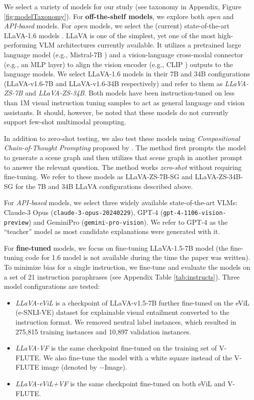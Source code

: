 We select a variety of models for our study (see taxonomy in Appendix, Figure \ref{fig:modelTaxonomy}). For \textbf{off-the-shelf models}, we explore both \textit{open} and \textit{API-based} models. For \textit{open} models, we select the (current) state-of-the-art LLaVA-1.6 models \cite{liu2024llavanext}. LLaVA is one of the simplest, yet one of the most high-performing VLM architectures currently available. It utilizes a pretrained large language model (e.g., Mistral-7B \cite{jiang2023mistral}) and a vision-language cross-modal connector (e.g., an MLP layer) to align the vision encoder (e.g., CLIP \cite{radford2021learning}) outputs to the language models. We select LLaVA-1.6 models in their 7B and 34B configurations (LLaVA-v1.6-7B and LLaVA-v1.6-34B respectively) and refer to them as \textit{LLaVA-ZS-7B} and \textit{LLaVA-ZS-34B}. Both models have been instruction-tuned on less than 1M visual instruction tuning samples to act as general language and vision assistants. It should, however, be noted that these models do not currently support few-shot multimodal prompting.

In addition to zero-shot testing, we also test these models using \textit{Compositional Chain-of-Thought Prompting} proposed by \citet{mitra2023compositional}. The method first prompts the model to generate a scene graph and then utilizes that scene graph in another prompt to answer the relevant question. The method works \textit{zero-shot} without requiring fine-tuning. We refer to these models as LLaVA-ZS-7B-SG and LLaVA-ZS-34B-SG for the 7B and 34B LLaVA configurations described above. 

For \textit{API-based} models, we select three widely available state-of-the-art VLMs: Claude-3 Opus (\texttt{claude-3-opus-20240229})\cite{claude3}, GPT-4 (\texttt{gpt-4-1106-vision-preview}) \cite{gpt4v} and GeminiPro (\texttt{gemini-pro-vision})\cite{team2023gemini}. We refer to GPT-4 as the ``teacher'' model as most candidate explanations were generated with it. 

For \textbf{fine-tuned} models, we focus on fine-tuning LLaVA-1.5-7B model \cite{liu2023improvedllava} (the fine-tuning code for 1.6 model is not available during the time the paper was written). To minimize bias for a single instruction, we fine-tune and evaluate the models on a set of 21 instruction paraphrases (see Appendix Table \ref{tab:instructs}). Three model configurations are tested:
\begin{itemize}[leftmargin=*]
    \itemsep0em
    \item \textit{LLaVA-eViL} is a checkpoint of LLaVA-v1.5-7B further fine-tuned on the eViL (e-SNLI-VE) dataset for explainable visual entailment \cite{kayser2021vil} converted to the instruction format. We removed neutral label instances, which resulted in 275,815 training instances and 10,897 validation instances.
    \item \textit{LLaVA-VF} is the same checkpoint fine-tuned on the training set of V-FLUTE. We also fine-tune the model with a white square instead of the V-FLUTE image (denoted by $-$Image).
    \item \textit{LLaVA-eViL+VF} is the same checkpoint fine-tuned on both eViL and V-FLUTE.
\end{itemize}

